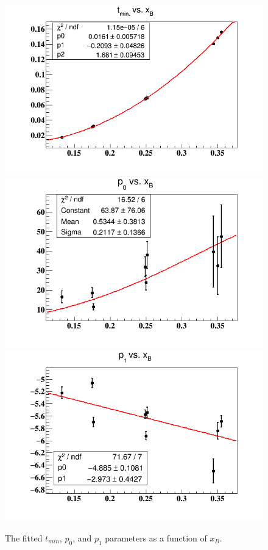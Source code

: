 \begin{figure}[tpb]
   \centering
\includegraphics[scale=0.37]{fig_updated/tmin-xB-fit.png}\\
\includegraphics[scale=0.37]{fig_updated/p0-xB-fit.png}\\
\includegraphics[scale=0.37]{fig_updated/p1-xB-fit.png}
\caption{The fitted $t_{min}$, $p_0$, and $p_1$ parameters as a function of 
$x_B$.}
\label{fig:free-proton-alu}
\end{figure}






